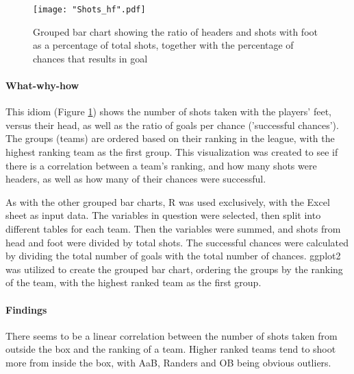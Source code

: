 \documentclass[Report.tex]{subfiles}
\begin{document}
\begin{figure}
\center
\texttt{[image: "Shots\_hf".pdf]}
\caption{Grouped bar chart showing the ratio of headers and shots with foot as
a percentage of total shots, together with the percentage of chances that
results in goal}
\label{Fig:Shots_HF} 
\end{figure}

\paragraph{What-why-how\\}
This idiom (Figure \ref{Fig:Shots_HF}) shows the number of shots taken with the players' feet,
versus their head, as well as the ratio of goals per chance ('successful
chances'). The groups (teams) are ordered based on their ranking in the league,
with the highest ranking team as the first group. 
This visualization was created to see if
there is a correlation between a team's ranking, and how many shots were headers,
as well as how many of their chances were successful.

As with the other grouped bar charts, R was used exclusively, with the Excel
sheet as input data. 
The variables in question were selected, then split into different tables for
each team. Then the variables were summed, and shots from head and foot were
divided by total shots. The successful chances were calculated by dividing the
total number of goals with the total number of chances. 
ggplot2 was utilized to create the grouped bar chart, ordering the groups by the
ranking of the team, with the highest ranked team as the first group.

\paragraph{Findings\\}
There seems to be a linear correlation between the number of shots taken from outside the box
and the ranking of a team. Higher ranked teams tend to shoot more from inside the box, with AaB, Randers and OB being obvious outliers. 
\end{document}

